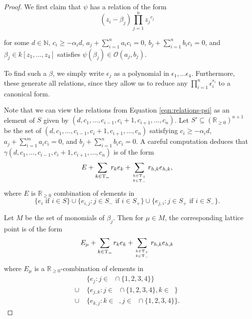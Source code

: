 \documentclass{amsart}
\theoremstyle{plain}
\theoremstyle{definition}
\theoremstyle{remark}
\numberwithin{equation}{section}
\newcommand\bida{a}
\newcommand\bidb{b}
\DeclareMathOperator{\Te}{T_=}
\DeclareMathOperator{\Tp}{T_+}
\DeclareMathOperator{\Tm}{T_-}
\begin{document}
\begin{proof}
We first claim that $\psi$ has a relation of the form
\begin{equation}\label{eqn:relations-psi}
	(z_i - \beta_j)\prod_{j=1}^n {z_j}^{c_{j}}
\end{equation}

\noindent
for some $d\in \mathbb{N}$, $c_i \ge -\alpha_i d$, $\bida_j + \sum_{i = 1}
^n \bida_i c_i = 0$, $\bidb_j + \sum_{i=1}^n \bidb_i c_i = 0$, and $\beta_j \in
k[z_1, \ldots, z_4]$ satisfies $\psi(\beta_j)\in \mathscr{O}(\bida_j,
\bidb_j)$.

To find such a $\beta$, we simply write $\epsilon_j$ as a 
polynomial in $\epsilon_1, \ldots \epsilon _4$. Furthermore, these
generate all relations, since they allow us to reduce any $\prod_{i =
1}^n \epsilon_i^{r_i}$ to a canonical form. 

Note that we can view the relations from Equation
\ref{eqn:relations-psi} as an element of $S$ given
by $(d, c_1, \ldots, c_{i-1}, c_i + 1, c_{i+1}, \ldots , c_n)$.  Let $S'\subseteq (\mathbb{R}_{\ge 0})^{n+1}$ be the
set of $(d, c_1, \ldots, c_{i-1}, c_i + 1, c_{i+1}, \ldots , c_n)$ satisfying $c_i \ge -\alpha_i d$,
$\bida_j + \sum_{i = 1}^m \bida_i c_i = 0$, and $\bidb_j + \sum_{i=1}^n \bidb_i c_i
= 0$.  A careful computation deduces that $\gamma (d, c_1, \ldots, c_{i-1}, c_i + 1, c_{i+1}, \ldots, c_n)$ is of the form 
\[
	E + \sum_{k\in \Te} r_k e_k + \sum_{h\in \Tp \atop k\in \Tm} r_{h,k} e_{h,k},
\] 
where $E$ is $\mathbb{R}_{\ge 0}$
combination of elements in 
\[
	\{e_i \mbox{ if } i\in S\} \cup \{e_{i,j}: j\in S_- \mbox{ if } i \in S_+\} \cup \{e_{j,i}: j\in S_+ \mbox{ if } i \in S_-\}.
\]


Let $M$ be the set of monomials of $\beta_j$.  Then for $\mu\in M$, the corresponding lattice point is of the form
\[
	E_\mu + \sum_{k\in \Te} r_k e_k + \sum_{h\in \Tp \atop k\in \Tm} r_{h,k} e_{h,k}
\]
where $E_\mu$ is a $\mathbb{R}_{\ge 0}$-combination of elements in
\begin{align*}
			& \{e_j : j\in \Te \cap \{1, 2, 3, 4\}\} \\
	\cup \; 	& \{e_{j, k}: j\in \Te \cap \{1, 2, 3, 4\}, k\in \Tm\}\\
	\cup \; 	& \{e_{k,j}: k\in \Tp, j\in \Tm \cap \{1, 2, 3, 4\}\}.
\end{align*}


\end{proof}
\end{document}
